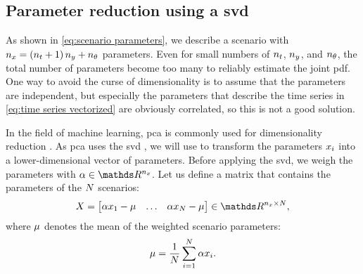 \subsection{Parameter reduction using a \acl{svd}}
\label{sec:svd}

As shown in \cref{eq:scenario parameters}, we describe a scenario with $n_x = \left( n_t + 1 \right) n_y + n_\theta$ parameters.
Even for small numbers of $n_t$, $n_y$, and $n_\theta$, the total number of parameters become too many to reliably estimate the joint \ac{pdf}.
One way to avoid the curse of dimensionality is to assume that the parameters are independent, but especially the parameters that describe the time series in \cref{eq:time series vectorized} are obviously correlated, so this is not a good solution.

In the field of machine learning, \ac{pca} is commonly used for dimensionality reduction \autocite{abdi2010principal}.
As \ac{pca} uses the \ac{svd} \autocite{golub2013matrix}, we will use  to transform the parameters $x_{i}$ into a lower-dimensional vector of parameters.
Before applying the \ac{svd}, we weigh the parameters with $\weights \in \realnumbers^{\dimensionscenariopars}$.
Let us define a matrix that contains the parameters of the $N$ scenarios:
\begin{equation}
	\scenarioparsmatrix = \begin{bmatrix}
		\weights\scenariopars_1-\svdmean & \ldots & \weights\scenariopars_{\scenariosnumberof}-\svdmean
	\end{bmatrix} \in \realnumbers^{\dimensionscenariopars \times \scenariosnumberof},
\end{equation}
where $\mu$ denotes the mean of the weighted scenario parameters:
\begin{equation}
	\mu = \frac{1}{N} \sum_{i=1}^{N} \alpha x_{i}.
\end{equation}

